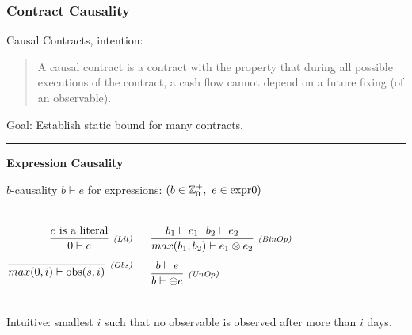 \documentclass[xcolor=dvipsnames,11pt]{beamer}
\newcommand{\comment}[2]{{\tiny \color{Orange}{$\spadesuit${\bf #1: }{\sf #2}$\spadesuit$}}}
\newcommand{\jbcomment}[1]{\comment{JB}{#1}}
\renewcommand{\emph}[1]{\textcolor{structure!60}{#1}}
\newcommand{\ttt}[1]{\mbox{\cd{#1}}}
\begin{document}
\newcommand{\crule}[3]{\frac{#2}{#3}\ \mbox{\scriptsize \it #1}}

\begin{frame}[t]
    \frametitle{Contract Causality}

\emph{Causal Contracts, intention:}
{\footnotesize
\begin{quote}
 A \emph{causal contract} is a contract with the property that during all
   possible executions of the contract, a cash flow cannot depend on a
   future fixing (of an observable).
\end{quote}
Goal: Establish static bound for many contracts.
}
\smallskip
\hrule

\medskip
\emph{\textbf{Expression Causality}}

\emph{$b$-causality} $ b \vdash e$ for \emph{expressions}:
{\scriptsize $ (b \in \mathbb{Z}_0^+, \ e \in \ttt{expr0})$}

\begin{columns}
\begin{align*}
\crule{(Lit)}{e \mbox{ is a literal}}{0 \vdash e}&\\[1ex]
 \crule{(Obs)}{}{max(0,i) \vdash \ttt{obs}(s,i)}&\\
\end{align*}

\begin{align*}
&\crule{(BinOp)}{b_1 \vdash e_1\ \ b_2 \vdash e_2 }{max(b_1,b_2) \vdash e_1 \otimes e_2}\\[1ex]
&\crule{(UnOp)}{b \vdash e}{b \vdash \ominus e}\\
\end{align*}
\end{columns}
Intuitive: smallest $i$ such that no observable is observed \emph{after more than $i$ days}.

\end{frame}
\end{document}
